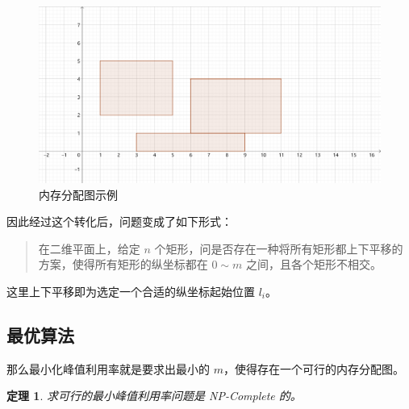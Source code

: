 \documentclass{noiassignment}
\newtheorem{theorem}{定理}[section]
\begin{document}
	\begin{figure}[htbp]
		\centering
		\includegraphics[scale=0.5]{assets/1}
		\caption{内存分配图示例}
		\label{mm_graph_example}
	\end{figure}
	
	因此经过这个转化后，问题变成了如下形式：

	\begin{quotation}
		在二维平面上，给定 $n$ 个矩形，问是否存在一种将所有矩形都上下平移的方案，使得所有矩形的纵坐标都在 $0 \sim m$ 之间，且各个矩形不相交。
	\end{quotation}

	这里上下平移即为选定一个合适的纵坐标起始位置 $l_i$。

	\subsection{最优算法}
	那么最小化峰值利用率就是要求出最小的 $m$，使得存在一个可行的内存分配图。

	\begin{theorem}
		求可行的最小峰值利用率问题是 NP-Complete 的。
	\end{theorem}
\end{document}
